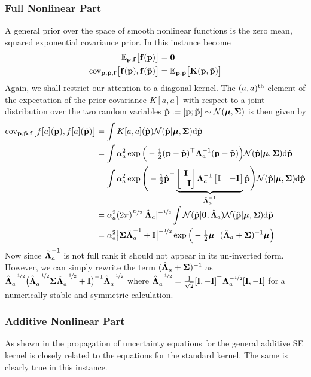 \subsubsection{Full Nonlinear Part}
A general prior over the space of smooth nonlinear functions is the zero mean, squared exponential covariance prior. In this instance  become 
\begin{align*}
\mathbb{E}_{\mathbf{p},\mathbf{f}}\big[\mathbf{f}(\mathbf{p})\big] 
&= \mathbf{0} \\
\mathrm{cov}_{\mathbf{p},\tilde{\mathbf{p}},\mathbf{f}}\big[\mathbf{f}(\mathbf{p}), \mathbf{f}(\tilde{\mathbf{p}})\big]
&= \mathbb{E}_{\mathbf{p},\tilde{\mathbf{p}}}\big[\mathbf{K}(\mathbf{p},\tilde{\mathbf{p}})\big]
\end{align*}
Again, we shall restrict our attention to a diagonal kernel. The $(a,a)^{\text{th}}$ element of the expectation of the prior covariance $K[a,a]$ with respect to a joint distribution over the two random variables $\hat{\mathbf{p}} := [\mathbf{p};\tilde{\mathbf{p}}] \sim \mathcal{N}(\boldsymbol{\mu},\boldsymbol{\Sigma})$ is then given by
\begin{align}
\nonumber \cov_{\bp,\tbp,\bff}\big[f[a](\bp), f[a](\tbp)\big]
&= \int K[a,a](\hbp) \cN(\hbp | \bm, \bS) \dd \hbp \\
\nonumber &= \int  \alpha_{a}^2 \exp\Big(-\half(\bp - \tbp)\T\bLa_{a}^{-1}(\bp - \tbp) \Big)
\cN(\hbp | \bm, \bS) \dd \hbp \\
\nonumber &= \int  \alpha_{a}^2 \exp\Bigg(-\half\hbp\T 
\underbrace{ \bmat{\bI \\ -\bI}\bLa_{a}^{-1} \bmat{\bI & -\bI} }_{\hat\bLa_{a}^{-1}}
\hbp \Bigg) \cN(\hbp | \bm, \bS) \dd \hbp \\[-0.1cm]
\nonumber &=  \alpha_{a}^2 (2\pi)^{\sfrac{D}{2}}|\hat\bLa_{a}|^{-\sha} \int \cN(\hbp|\bO, \hat\bLa_{a}) \cN(\hbp | \bm, \bS) \dd \hbp \\
&=  \alpha_{a}^2 \big|\bS\hat\bLa_{a}\inv + \bI\big|^{-\sha} 
\exp\Big( - \half \bm\T (\hat\bLa_{a} + \bS)\inv \bm \Big)
\label{eqn:SEprop}
\end{align}
Now since $\hat{\boldsymbol{\Lambda}}_{a}^{-1}$ is not full rank it should not appear in its un-inverted form. However, we can simply rewrite the term $(\hat{\boldsymbol{\Lambda}}_{a} + \boldsymbol{\Sigma})^{-1}$ as $\hat{\boldsymbol{\Lambda}}_{a}^{-\nicefrac{1}{2}}  \big(\hat{\boldsymbol{\Lambda}}_{a}^{-\nicefrac{1}{2}} \boldsymbol{\Sigma}\hat{\boldsymbol{\Lambda}}_{a}^{-\nicefrac{1}{2}}  + \mathbf{I}\big)^{-1}\hat{\boldsymbol{\Lambda}}_{a}^{-\nicefrac{1}{2}} $ where $\hat{\boldsymbol{\Lambda}}_{a}^{-\nicefrac{1}{2}} = \tfrac{1}{\sqrt{2}}[\mathbf{I},-\mathbf{I}]^\top\boldsymbol{\Lambda}_{a}^{-\nicefrac{1}{2}}[\mathbf{I},-\mathbf{I}]$ for a numerically stable and symmetric calculation.



\subsubsection{Additive Nonlinear Part}
As shown in  the propagation of uncertainty equations for the general additive SE kernel is closely related to the equations for the standard kernel. The same is clearly true in this instance.



